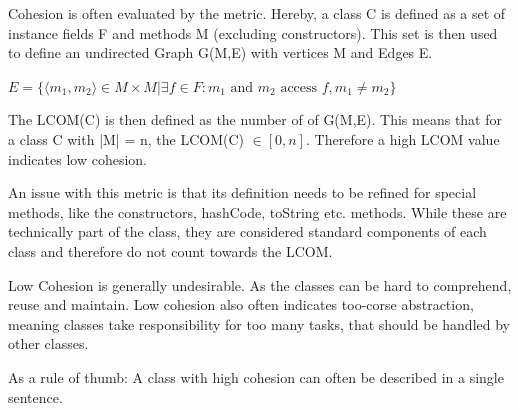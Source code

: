 \documentclass[
../../Software_Engineering_Summary.tex,
]
{subfiles}
\begin{document}
\begin{defbox}
    Cohesion is often evaluated by the  metric.
    Hereby, a class C is defined as a set of instance fields F and methods M (excluding constructors). 
    This set is then used to define an undirected Graph G(M,E) with vertices M and Edges E.
    
    \begin{center}
        \begin{smallmathbox*}
            $E = \{\langle m_1, m_2\rangle \in M \times M | \exists f \in F : m_1 \text{ and } m_2 \text{ access } f, m_1 \not = m_2\}$
        \end{smallmathbox*}
    \end{center}
    The LCOM(C) is then defined as the number of  of G(M,E). 
    This means that for a class C with |M| = n, the LCOM(C) $\in [0, n]$. Therefore a high LCOM value indicates low cohesion.

    An issue with this metric is that its definition needs to be refined for special methods, like the constructors, hashCode, toString etc. methods. While these are technically part of the class, they are considered standard components of each class and therefore do not count towards the LCOM.
\end{defbox}

Low Cohesion is generally undesirable. As the classes can be hard to comprehend, reuse and maintain. Low cohesion also often indicates too-corse abstraction, meaning classes take responsibility for too many tasks, that should be handled by other classes.

As a rule of thumb: A class with high cohesion can often be described in a single sentence.
\end{document}
